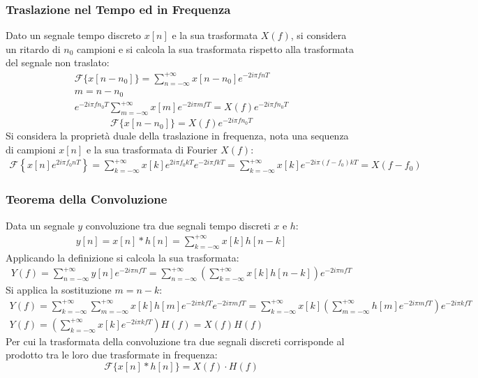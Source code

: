 \documentclass{article}
\numberwithin{equation}{subsection}
\begin{document}
\subsubsection{Traslazione nel Tempo ed in Frequenza}

Dato un segnale tempo discreto $x[n]$ e la sua trasformata $X(f)$, si considera un ritardo di $n_0$ campioni e si calcola la sua trasformata rispetto alla trasformata del 
segnale non traslato:
\begin{gather*}
    \mathscr{F}\{x[n-n_0]\}=\displaystyle\sum_{n=-\infty}^{+\infty}x[n-n_0]e^{-2i\pi fnT}\\
    m=n-n_0\\
    e^{-2i\pi fn_0T}\sum_{m=-\infty}^{+\infty}x[m]e^{-2i\pi mfT}=X(f)e^{-2i\pi fn_0T}
\end{gather*}
\begin{equation}
    \mathscr{F}\{x[n-n_0]\}=X(f)e^{-2i\pi fn_0T}
\end{equation}
Si considera la proprietà duale della traslazione in frequenza, nota una sequenza di campioni $x[n]$ e la sua trasformata di Fourier $X(f)$:
\begin{gather}
    \mathscr{F}\left\{x[n]e^{2i\pi f_0nT}\right\}=\displaystyle\sum_{k=-\infty}^{+\infty}x[k]e^{2i\pi f_0kT}e^{-2i\pi fkT}=\sum_{k=-\infty}^{+\infty}x[k]e^{-2i\pi (f-f_0)kT}=X(f-f_0)
\end{gather} 

\subsubsection{Teorema della Convoluzione}

Data un segnale $y$ convoluzione tra due segnali tempo discreti $x$ e $h$:
\begin{gather*}
    y[n]=x[n]*h[n]=\displaystyle\sum_{k=-\infty}^{+\infty}x[k]h[n-k]
\end{gather*}
Applicando la definizione si calcola la sua trasformata:
\begin{gather*}
    Y(f)=\displaystyle\sum_{n=-\infty}^{+\infty}y[n]e^{-2i\pi nfT}=\displaystyle\sum_{n=-\infty}^{+\infty}\left(\sum_{k=-\infty}^{+\infty}x[k]h[n-k]\right)e^{-2i\pi nfT}
\end{gather*}
Si applica la sostituzione $m=n-k$:
\begin{gather*}
    Y(f)=\displaystyle\sum_{k=-\infty}^{+\infty}\sum_{m=-\infty}^{+\infty}x[k]h[m]e^{-2i\pi kfT}e^{-2i\pi mfT}=\sum_{k=-\infty}^{+\infty}x[k]\left(\sum_{m=-\infty}^{+\infty}h[m]e^{-2i\pi mfT}\right)e^{-2i\pi kfT}\\
    Y(f)=\displaystyle\left(\sum_{k=-\infty}^{+\infty}x[k]e^{-2i\pi kfT}\right)H(f)=X(f)H(f)
\end{gather*}
Per cui la trasformata della convoluzione tra due segnali discreti corrisponde al prodotto tra le loro due trasformate in frequenza:
\begin{equation}
    \mathscr{F}\{x[n]*h[n]\}=X(f)\cdot H(f)
\end{equation}
\end{document}
